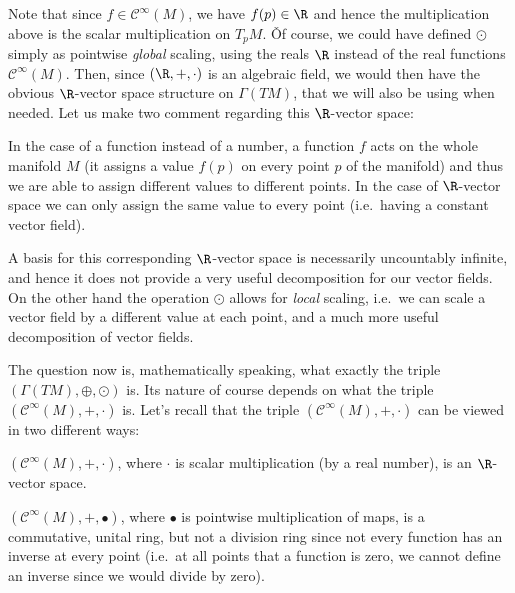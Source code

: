 Note that since $f\in \mathcal{C}^\infty(M)$, we have $f(p)\in \R$ and hence the multiplication above is the scalar
multiplication on $T_p M$. \v

Of course, we could have defined $\odot$ simply as pointwise \emph{global} scaling, using the reals $\R$ instead of
the real functions $\mathcal{C}^\infty(M)$. Then, since $(\R,+,\cdot)$ is an algebraic field, we would then have the
obvious $\R$-vector space structure on $\Gamma(TM)$, that we will also be using when needed. Let us make two comment
regarding this $\R$-vector space:
\bit
\item In the case of a function instead of a number, a function $f$ acts on the whole manifold $M$ (it assigns a
value $f(p)$ on every point $p$ of the manifold) and thus we are able to assign different values to different points.
In the case of $\R$-vector space we can only assign the same value to every point (i.e.\ having a constant vector field).
\item A basis for this corresponding $\R$-vector space is necessarily uncountably infinite, and hence it does not
provide a very useful decomposition for our vector fields. On the other hand the operation $\odot$ allows for
\emph{local} scaling, i.e.\ we can scale a vector field by a different value at each point, and a much more useful
decomposition of vector fields.
\eit

The question now is, mathematically speaking, what exactly the triple $(\Gamma(TM),\oplus,\odot)$ is. Its nature of
course depends on what the triple $(\mathcal{C}^\infty(M),+,\cdot)$ is. Let's recall that the triple $
(\mathcal{C}^\infty(M),+,\cdot)$ can be viewed in two different ways:
\bit
\item $(\mathcal{C}^\infty(M),+,\cdot)$, where $\cdot$ is scalar multiplication (by a real number), is an
$\R$-vector space.
\item $(\mathcal{C}^\infty(M),+,\bullet)$, where $\bullet$ is pointwise multiplication of maps, is a commutative,
unital ring, but not a division ring since not every function has an inverse at every point (i.e.\ at all points that a
function is zero, we cannot define an inverse since we would divide by zero).
\eit

